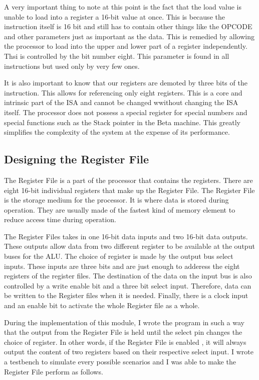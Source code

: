 A very important thing to note at this point is the fact that the load value is unable to load into a register a 16-bit value at once. This is because the instruction itself is 16 bit and still has to contain other things like the OPCODE and other parameters just as important as the data. This is remedied by allowing the processor to load into the upper and lower part of a register independently. Thsi is controlled by the bit number eight. This parameter is found in all instructions but used only by very few ones.

It is also important to know that our registers are demoted by three bits of the instruction. This allows for referencing only eight registers. This is a core and intrinsic part of the ISA and cannot be changed wwithout changing the ISA itself.
The processor does not possess a special register for special numbers and special functions such as the Stack pointer in the Beta machine. This greatly simplifies the complexity of the system at the expense of its performance.  

\subsection{Designing the Register File}
The Register File is a part of the processor that contains the registers. There are eight 16-bit individual registers that make up the Register File. The Register File is the storage medium for the processor. It is where data is stored during operation. They are usually made of the fastest kind of memory element to reduce access time during operation. 

The Register Files takes in one 16-bit data inputs and two 16-bit data outputs. These outputs allow data from two different register to be available at the output buses for the ALU. The choice of register is made by the output bus select inputs. These inputs are three bits and are just enough to adderess the eight registers of the register files. The destination of the data on the input bus is also controlled by a write enable bit and a three bit select input. Therefore, data can be written to the Register files when it is needed. Finally, there is a clock input and an enable bit to activate the whole Register file as a whole.

During the implementation of this module, I wrote the program in such a way that the output from the Register File is held until the select pin changes the choice of register. In other words, if the Register File is enabled , it will always output the content of two registers based on their respective select input. I wrote a testbench to simulate every possible scenarios and I was able to make the Register File perform as follows.

